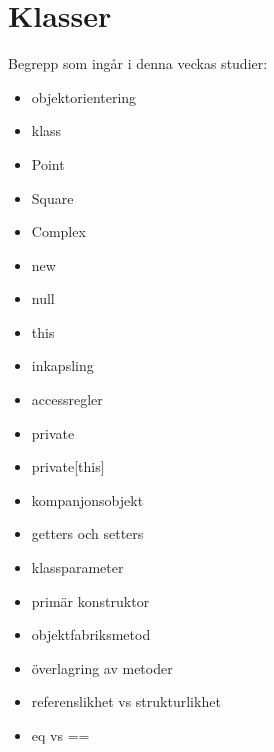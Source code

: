 \chapter{Klasser}\label{chapter:W06}
Begrepp som ingår i denna veckas studier:
\begin{itemize}[noitemsep,label={$\square$},leftmargin=*]
\item objektorientering
\item klass
\item Point
\item Square
\item Complex
\item new
\item null
\item this
\item inkapsling
\item accessregler
\item private
\item private[this]
\item kompanjonsobjekt
\item getters och setters
\item klassparameter
\item primär konstruktor
\item objektfabriksmetod
\item överlagring av metoder
\item referenslikhet vs strukturlikhet
\item eq vs ==\end{itemize}
